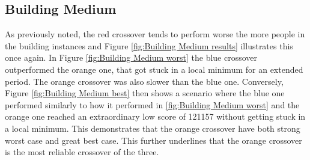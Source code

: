 \newpage

\subsection{Building Medium}
As previously noted, the red crossover tends to perform worse the more people in the building instances and Figure \ref{fig:Building Medium results} illustrates this once again. In Figure \ref{fig:Building Medium worst} the blue crossover outperformed the orange one, that got stuck in a local minimum for an extended period. The orange crossover was also slower than the blue one. Conversely, Figure \ref{fig:Building Medium best} then shows a scenario where the blue one performed similarly to how it performed in \ref{fig:Building Medium worst} and the orange one reached an extraordinary low score of 121157 without getting stuck in a local minimum. This demonstrates that the orange crossover have both strong worst case and great best case. This further underlines that the orange crossover is the most reliable crossover of the three.

